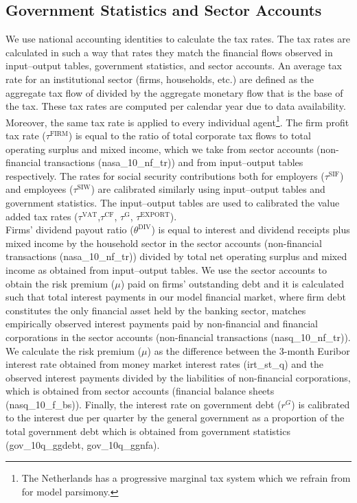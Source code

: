 \subsection{Government Statistics and Sector Accounts}
We use national accounting identities to calculate the tax rates. The tax rates are calculated in such a way that rates they match the financial flows observed in input–output tables, government statistics, and sector accounts. An average tax rate for an institutional sector (firms, households, etc.) are defined as the aggregate tax flow of divided by the aggregate monetary flow that is the base of the tax. These tax rates are computed per calendar year due to data availability. Moreover, the same tax rate is applied to every individual agent\footnote{The Netherlands has a progressive marginal tax system which we refrain from for model parsimony.}. The firm profit tax rate ($\tau^{\text{FIRM}}$) is equal to the ratio of total corporate tax flows to total operating surplus and mixed income, which we take from sector accounts (non-financial transactions (nasa\_10\_nf\_tr)) and from input–output tables respectively. The rates for social security contributions both for employers ($\tau^{\text{SIF}}$) and employees ($\tau^{\text{SIW}}$) are calibrated similarly using input–output tables and government statistics. The input–output tables are used to calibrated the value added tax rates ($\tau^{\text{VAT}}$,$\tau^{\text{CF}}$, $\tau^{\text{G}}$, $\tau^{\text{EXPORT}}$).\\

Firms’ dividend payout ratio ($\theta^{\text{DIV}}$) is equal to interest and dividend receipts plus mixed income by the household sector in the sector accounts (non-financial transactions (nasa\_10\_nf\_tr)) divided by total net operating surplus and mixed income as obtained from input–output tables. We use the sector accounts to obtain the risk premium ($\mu$) paid on firms’ outstanding debt and it is calculated such that total interest payments in our model financial market, where firm debt constitutes the only financial asset held by the banking sector, matches empirically observed interest payments paid by non-financial and financial corporations in the sector accounts (non-financial transactions (nasq\_10\_nf\_tr)). We calculate the risk premium ($\mu$) as the difference between the 3-month Euribor interest rate obtained from money market interest rates (irt\_st\_q) and the observed interest payments divided by the liabilities of non-financial corporations, which is obtained from sector accounts (financial balance sheets (nasq\_10\_f\_bs)). Finally, the interest rate on government debt ($r^G$) is calibrated to the interest due per quarter by the general government as a proportion of the total government debt which is obtained from government statistics (gov\_10q\_ggdebt, gov\_10q\_ggnfa).
